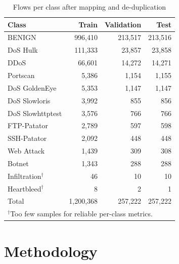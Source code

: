 \documentclass[conference]{IEEEtran}
\begin{document}
\begin{table}[t]
\caption{Flows per class after mapping and de-duplication}
\label{tab:classes}
\centering
\footnotesize
\begin{tabular}{lrrr}
\toprule
Class & Train & Validation & Test \\
\midrule
BENIGN & 996,410 & 213,517 & 213,516 \\
DoS Hulk & 111,333 & 23,857 & 23,858 \\
DDoS & 66,601 & 14,272 & 14,271 \\
Portscan & 5,386 & 1,154 & 1,155 \\
DoS GoldenEye & 5,353 & 1,147 & 1,147 \\
DoS Slowloris & 3,992 & 855 & 856 \\
DoS Slowhttptest & 3,576 & 766 & 766 \\
FTP-Patator & 2,789 & 597 & 598 \\
SSH-Patator & 2,092 & 448 & 448 \\
Web Attack & 1,439 & 309 & 308 \\
Botnet & 1,343 & 288 & 288 \\
Infiltration$^\dagger$ & 46 & 10 & 10 \\
Heartbleed$^\dagger$ & 8 & 2 & 1 \\
\midrule
Total & 1,200,368 & 257,222 & 257,222 \\
\bottomrule
\multicolumn{4}{l}{$^\dagger$Too few samples for reliable per-class metrics.}
\end{tabular}
\end{table}

\section{Methodology}
\end{document}
